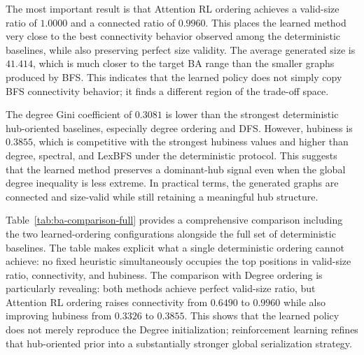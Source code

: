 The most important result is that Attention RL ordering achieves a valid-size ratio of $1.0000$ and a connected ratio of $0.9960$. This places the learned method very close to the best connectivity behavior observed among the deterministic baselines, while also preserving perfect size validity. The average generated size is $41.414$, which is much closer to the target BA range than the smaller graphs produced by BFS. This indicates that the learned policy does not simply copy BFS connectivity behavior; it finds a different region of the trade-off space.

The degree Gini coefficient of $0.3081$ is lower than the strongest deterministic hub-oriented baselines, especially degree ordering and DFS. However, hubiness is $0.3855$, which is competitive with the strongest hubiness values and higher than degree, spectral, and LexBFS under the deterministic protocol. This suggests that the learned method preserves a dominant-hub signal even when the global degree inequality is less extreme. In practical terms, the generated graphs are connected and size-valid while still retaining a meaningful hub structure.

Table~\ref{tab:ba-comparison-full} provides a comprehensive comparison including the two learned-ordering configurations alongside the full set of deterministic baselines. The table makes explicit what a single deterministic ordering cannot achieve: no fixed heuristic simultaneously occupies the top positions in valid-size ratio, connectivity, and hubiness. The comparison with Degree ordering is particularly revealing: both methods achieve perfect valid-size ratio, but Attention RL ordering raises connectivity from $0.6490$ to $0.9960$ while also improving hubiness from $0.3326$ to $0.3855$. This shows that the learned policy does not merely reproduce the Degree initialization; reinforcement learning refines that hub-oriented prior into a substantially stronger global serialization strategy.

